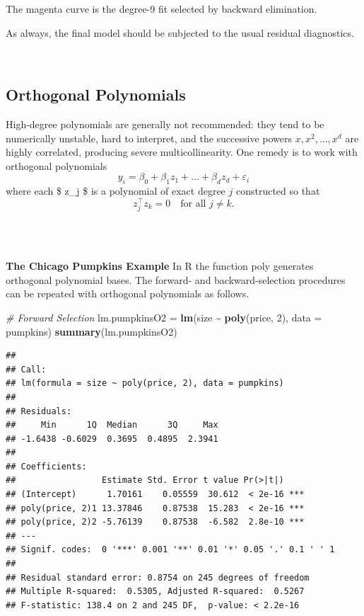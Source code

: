\documentclass[
]{book}
\newenvironment{Shaded}{\begin{snugshade}}{\end{snugshade}}
\newcommand{\AttributeTok}[1]{\textcolor[rgb]{0.13,0.29,0.53}{#1}}
\newcommand{\CommentTok}[1]{\textcolor[rgb]{0.56,0.35,0.01}{\textit{#1}}}
\newcommand{\DecValTok}[1]{\textcolor[rgb]{0.00,0.00,0.81}{#1}}
\newcommand{\FunctionTok}[1]{\textcolor[rgb]{0.13,0.29,0.53}{\textbf{#1}}}
\newcommand{\NormalTok}[1]{#1}
\newcommand{\OtherTok}[1]{\textcolor[rgb]{0.56,0.35,0.01}{#1}}
\newcommand{\SpecialCharTok}[1]{\textcolor[rgb]{0.81,0.36,0.00}{\textbf{#1}}}
\begin{document}
The magenta curve is the degree-9 fit selected by backward elimination.

As always, the final model should be subjected to the usual residual diagnostics.

~

\subsection{Orthogonal Polynomials}\label{orthogonal-polynomials}

High-degree polynomials are generally not recommended: they tend to be numerically unstable, hard to interpret, and the successive powers \(x,x^2,\dots,x^d\) are highly correlated, producing severe multicollinearity. One remedy is to work with orthogonal polynomials
\[y_i=\beta_0+\beta_1z_1+\ldots+\beta_d z_d+\varepsilon_i\]
where each \$ z\_j \$ is a polynomial of exact degree \(j\) constructed so that
\[z_j^\top z_k = 0 \quad\text{for all }j\neq k.\]\\
\strut ~

\textbf{The Chicago Pumpkins Example}
In R the function poly generates orthogonal polynomial bases. The forward- and backward-selection procedures can be repeated with orthogonal polynomials as follows.

\begin{Shaded}
\begin{Highlighting}[]
\CommentTok{\# Forward Selection}
\NormalTok{lm.pumpkinsO2 }\OtherTok{=} \FunctionTok{lm}\NormalTok{(size }\SpecialCharTok{\textasciitilde{}} \FunctionTok{poly}\NormalTok{(price, }\DecValTok{2}\NormalTok{), }\AttributeTok{data =}\NormalTok{ pumpkins)}
\FunctionTok{summary}\NormalTok{(lm.pumpkinsO2)}
\end{Highlighting}
\end{Shaded}

\begin{verbatim}
## 
## Call:
## lm(formula = size ~ poly(price, 2), data = pumpkins)
## 
## Residuals:
##     Min      1Q  Median      3Q     Max 
## -1.6438 -0.6029  0.3695  0.4895  2.3941 
## 
## Coefficients:
##                 Estimate Std. Error t value Pr(>|t|)    
## (Intercept)      1.70161    0.05559  30.612  < 2e-16 ***
## poly(price, 2)1 13.37846    0.87538  15.283  < 2e-16 ***
## poly(price, 2)2 -5.76139    0.87538  -6.582  2.8e-10 ***
## ---
## Signif. codes:  0 '***' 0.001 '**' 0.01 '*' 0.05 '.' 0.1 ' ' 1
## 
## Residual standard error: 0.8754 on 245 degrees of freedom
## Multiple R-squared:  0.5305, Adjusted R-squared:  0.5267 
## F-statistic: 138.4 on 2 and 245 DF,  p-value: < 2.2e-16
\end{verbatim}
\end{document}

